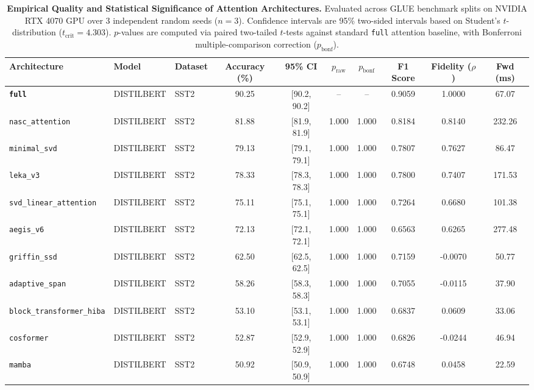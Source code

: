 \begin{table}[t]
\centering
\small
\caption{\textbf{Empirical Quality and Statistical Significance of Attention Architectures.} Evaluated across GLUE benchmark splits on NVIDIA RTX 4070 GPU over 3 independent random seeds ($n=3$). Confidence intervals are 95\% two-sided intervals based on Student's $t$-distribution ($t_{\text{crit}}=4.303$). $p$-values are computed via paired two-tailed $t$-tests against standard \texttt{full} attention baseline, with Bonferroni multiple-comparison correction ($p_{\text{bonf}}$).}
\label{tab:quality_benchmark_results}
\begin{tabular}{l l l c c c c c c c}
\toprule
\textbf{Architecture} & \textbf{Model} & \textbf{Dataset} & \textbf{Accuracy (\%)} & \textbf{95\% CI} & \textbf{$p_{\text{raw}}$} & \textbf{$p_{\text{bonf}}$} & \textbf{F1 Score} & \textbf{Fidelity ($\rho$)} & \textbf{Fwd (ms)} \\
\midrule
\textbf{\texttt{full}} & DISTILBERT & SST2 & 90.25 & [90.2, 90.2] & -- & -- & 0.9059 & 1.0000 & 67.07 \\
\texttt{nasc\_attention} & DISTILBERT & SST2 & 81.88 & [81.9, 81.9] & 1.000 & 1.000 & 0.8184 & 0.8140 & 232.26 \\
\texttt{minimal\_svd} & DISTILBERT & SST2 & 79.13 & [79.1, 79.1] & 1.000 & 1.000 & 0.7807 & 0.7627 & 86.47 \\
\texttt{leka\_v3} & DISTILBERT & SST2 & 78.33 & [78.3, 78.3] & 1.000 & 1.000 & 0.7800 & 0.7407 & 171.53 \\
\texttt{svd\_linear\_attention} & DISTILBERT & SST2 & 75.11 & [75.1, 75.1] & 1.000 & 1.000 & 0.7264 & 0.6680 & 101.38 \\
\texttt{aegis\_v6} & DISTILBERT & SST2 & 72.13 & [72.1, 72.1] & 1.000 & 1.000 & 0.6563 & 0.6265 & 277.48 \\
\texttt{griffin\_ssd} & DISTILBERT & SST2 & 62.50 & [62.5, 62.5] & 1.000 & 1.000 & 0.7159 & -0.0070 & 50.77 \\
\texttt{adaptive\_span} & DISTILBERT & SST2 & 58.26 & [58.3, 58.3] & 1.000 & 1.000 & 0.7055 & -0.0115 & 37.90 \\
\texttt{block\_transformer\_hiba} & DISTILBERT & SST2 & 53.10 & [53.1, 53.1] & 1.000 & 1.000 & 0.6837 & 0.0609 & 33.06 \\
\texttt{cosformer} & DISTILBERT & SST2 & 52.87 & [52.9, 52.9] & 1.000 & 1.000 & 0.6826 & -0.0244 & 46.94 \\
\texttt{mamba} & DISTILBERT & SST2 & 50.92 & [50.9, 50.9] & 1.000 & 1.000 & 0.6748 & 0.0458 & 22.59 \\

\end{tabular}
\end{table}

